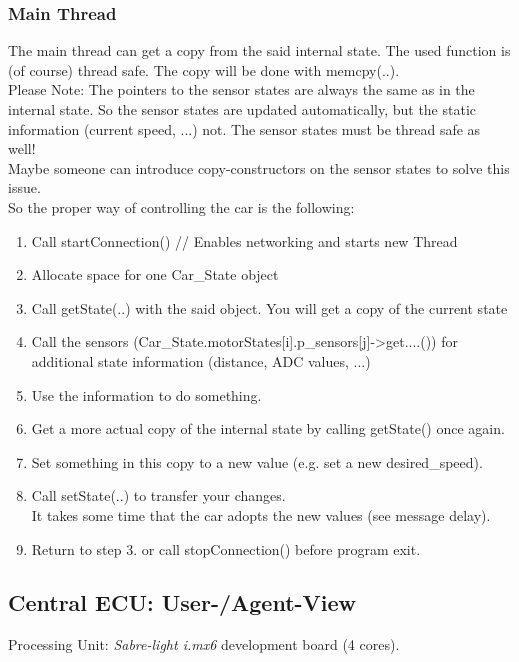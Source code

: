 \subsubsection{Main Thread}

The main thread can get a copy from the said internal state. The used function is (of course) thread safe. The copy will be done with memcpy(..).\\

Please Note: The pointers to the sensor states are always the same as in the internal state. So the sensor states are updated automatically, but the static information (current speed, ...) not. The sensor states must be thread safe as well!\\
Maybe someone can introduce copy-constructors on the sensor states to solve this issue.\\

So the proper way of controlling the car is the following:
\begin{enumerate}
 \item Call startConnection() // Enables networking and starts new Thread
 \item Allocate space for one Car\_State object
 \item Call getState(..) with the said object. You will get a copy of the current state
 \item Call the sensors (Car\_State.motorStates[i].p\_sensors[j]->get....()) for additional state information (distance, ADC values, ...)
 \item Use the information to do something.
 \item Get a more actual copy of the internal state by calling getState() once again.
 \item Set something in this copy to a new value (e.g. set a new desired\_speed).
 \item Call setState(..) to transfer your changes.\\
 It takes some time that the car adopts the new values (see message delay).
 \item Return to step 3. or call stopConnection() before program exit.\\
\end{enumerate}


\subsection{Central ECU: User-/Agent-View}

Processing Unit: \textsl{Sabre-light i.mx6} development board (4 cores).\\
	
